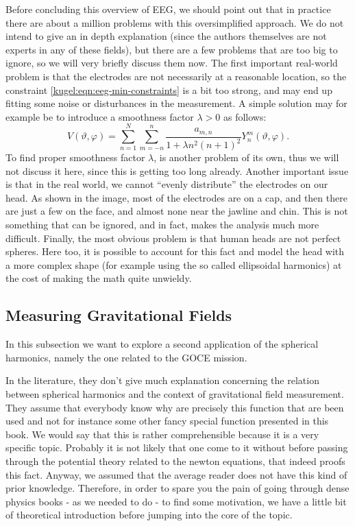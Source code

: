 Before concluding this overview of EEG, we should point out that in practice
there are about a million problems with this oversimplified approach. We do not
intend to give an in depth explanation (since the authors themselves are not
experts in any of these fields), but there are a few problems that are too big
to ignore, so we will very briefly discuss them now. The first important
real-world problem is that the electrodes are not necessarily at a reasonable
location, so the constraint \eqref{kugel:eqn:eeg-min-constraints} is a bit too
strong, and may end up fitting some noise or disturbances in the measurement. A
simple solution may for example be to introduce a smoothness factor $\lambda >
0$ as follows:
\begin{equation}
  V(\vartheta, \varphi) = \sum_{n=1}^N \sum_{m=-n}^n 
    \frac{a_{m,n}}{1 + \lambda n^2(n+1)^2} Y^m_n(\vartheta, \varphi).
\end{equation}
To find proper smoothness factor $\lambda$, is another problem of its own, thus
we will not discuss it here, since this is getting too long already. Another
important issue is that in the real world, we cannot ``evenly distribute'' the
electrodes on our head. As shown in the image, most of the electrodes are on a
cap, and then there are just a few on the face, and almost none near the jawline
and chin. This is not something that can be ignored, and in fact, makes the
analysis much more difficult. Finally, the most obvious problem is that human
heads are not perfect spheres. Here too, it is possible to account for this fact
and model the head with a more complex shape (for example using the so called
ellipsoidal harmonics) at the cost of making the math quite unwieldy.

\subsection{Measuring Gravitational Fields}
In this subsection we want to explore a second application of the spherical harmonics, namely the one related to the GOCE mission. 

In the literature, they don’t give much explanation concerning the relation between spherical harmonics and the context of gravitational 
field measurement. They assume that everybody know why are precisely this function that are been used and not for instance some other 
fancy special function presented in this book. We would say that this is rather comprehensible because it is a very specific topic. 
Probably it is not likely that one come to it without before passing through the potential theory related to the newton equations, 
that indeed proofs this fact. Anyway, we assumed that the average reader does not have this kind of prior knowledge. 
Therefore, in order to spare you the pain of going through dense physics books
\cite{blakely_1995, hofmann2005physical, griffiths_introduction_2015}
- as we needed to do - to find some motivation, we have a little bit of theoretical introduction before jumping into the core of the topic. 

